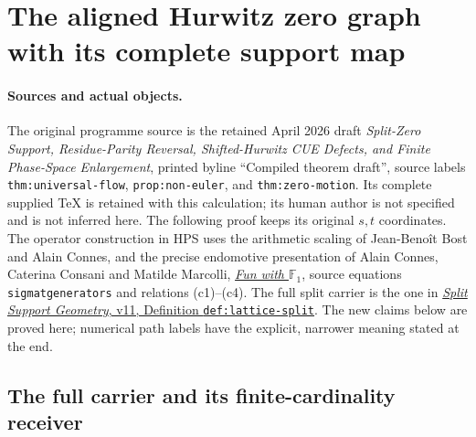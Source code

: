 \section{The aligned Hurwitz zero graph with its complete support map}
\label{sec:hurwitz-alignment-full-map}

\paragraph{Sources and actual objects.}
The original programme source is the retained April 2026 draft
\emph{Split-Zero Support, Residue-Parity Reversal, Shifted-Hurwitz CUE
Defects, and Finite Phase-Space Enlargement}, printed byline
``Compiled theorem draft'', source labels \texttt{thm:universal-flow},
\texttt{prop:non-euler}, and \texttt{thm:zero-motion}.
Its complete supplied TeX is retained with this calculation; its human
author is not specified and is not inferred here. The following proof
keeps its original $s,t$ coordinates. The operator construction in HPS
uses the arithmetic scaling of Jean-Beno\^it Bost and Alain Connes,
and the precise endomotive presentation of Alain Connes, Caterina
Consani and Matilde Marcolli,
\href{https://arxiv.org/abs/0806.2401v1}{\emph{Fun with $\mathbb F_1$}},
source equations \texttt{sigmatgenerators} and relations (c1)--(c4).
The full split carrier is the one in
\href{https://github.com/KokunoYumeto/zeta-function-research-reader/blob/a2851f9eb352e7e4376bc629de86fa4ed9c1c434/workbenches/splitzero-tandem/foundations/split-support-geometry-v11/split_support_geometry_arithmetic_curve_v11.tex}{\emph{Split Support Geometry}, v11, Definition \texttt{def:lattice-split}}.
The new claims below are proved here; numerical path labels have the
explicit, narrower meaning stated at the end.

\subsection{The full carrier and its finite-cardinality receiver}


